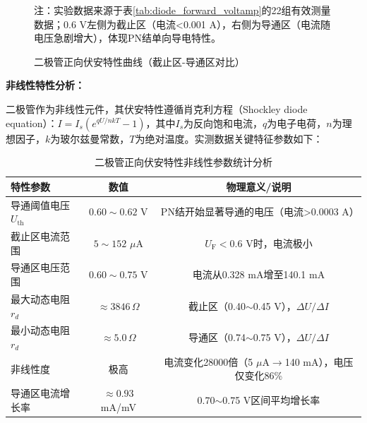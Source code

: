 \documentclass[11pt]{article}
\begin{document}
\begin{figure}[htbp]
  \caption{二极管正向伏安特性曲线（截止区-导通区对比）}
  \label{fig:diode_forward_voltamp_curve}
  \footnotesize{注：实验数据来源于表\ref{tab:diode_forward_voltamp}的22组有效测量数据；0.6 V左侧为截止区（电流<0.001 A），右侧为导通区（电流随电压急剧增大），体现PN结单向导电特性。}
\end{figure}

\noindent\textbf{非线性特性分析：}

二极管作为非线性元件，其伏安特性遵循肖克利方程（Shockley diode equation）：$I = I_s(e^{qU/nkT} - 1)$，其中$I_s$为反向饱和电流，$q$为电子电荷，$n$为理想因子，$k$为玻尔兹曼常数，$T$为绝对温度。实测数据关键特征参数如下：

\begin{table}[H]
  \centering
  \small
  \begin{tabular}{lcc}
    \toprule
    \textbf{特性参数} & \textbf{数值} & \textbf{物理意义/说明} \\
    \midrule
    导通阈值电压 $U_{\text{th}}$ & $0.60\sim0.62$ V & PN结开始显著导通的电压（电流>0.0003 A） \\
    截止区电流范围 & $5\sim152$ $\mu$A & $U_{\text{F}} < 0.6$ V时，电流极小 \\
    导通区电压范围 & $0.60\sim0.75$ V & 电流从0.328 mA增至140.1 mA \\
    最大动态电阻 $r_d$ & $\approx 3846\,\Omega$ & 截止区（0.40$\sim$0.45 V），$\Delta U/\Delta I$ \\
    最小动态电阻 $r_d$ & $\approx 5.0\,\Omega$ & 导通区（0.74$\sim$0.75 V），$\Delta U/\Delta I$ \\
    非线性度 & 极高 & 电流变化28000倍（5 $\mu$A$\to$140 mA），电压仅变化86\% \\
    导通区电流增长率 & $\approx 0.93$ mA/mV & 0.70$\sim$0.75 V区间平均增长率 \\
    \bottomrule
  \end{tabular}
  \caption{二极管正向伏安特性非线性参数统计分析}
  \label{tab:diode_nonlinear_stats}
\end{table}
\end{document}
